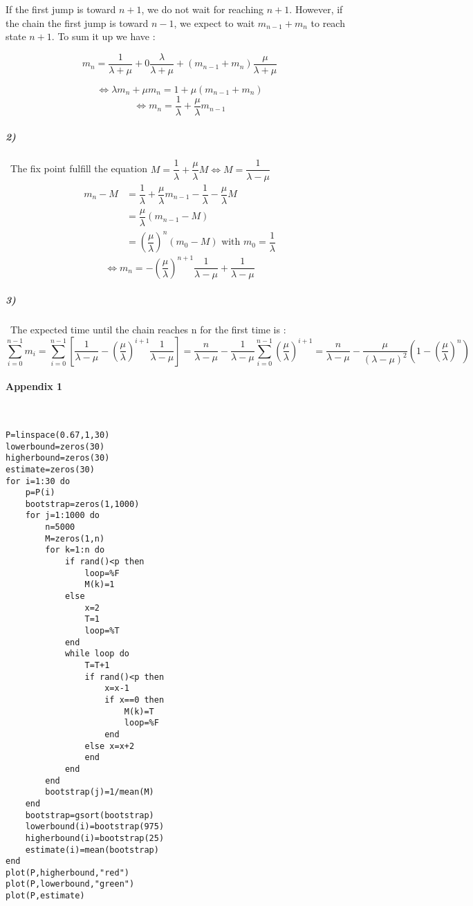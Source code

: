 \documentclass{article}
\begin{document}
If the first jump is toward $n+1$, we do not wait for reaching $n+1$. However, if the chain the first jump is toward $n-1$, we expect to wait $m_{n-1}+m_{n}$ to reach state $n+1$. To sum it up we have :

$$m_n=\dfrac{1}{\lambda+\mu}+0\dfrac{\lambda}{\lambda+\mu}+(m_{n-1}+m_{n})\dfrac{\mu}{\lambda+\mu}$$

$$\iff \lambda m_n+\mu m_n =1 + \mu (m_{n-1}+m_{n})$$
$$ \iff m_n=\dfrac{1}{\lambda}+\dfrac{\mu}{\lambda}m_{n-1}$$
\subparagraph{2)}
\
The fix point fulfill the equation $M=\dfrac{1}{\lambda}+\dfrac{\mu}{\lambda}M \iff M=\dfrac{1}{\lambda-\mu}$\\

\begin{align*}
m_n-M &= \dfrac{1}{\lambda}+\dfrac{\mu }{\lambda}m_{n-1}-\dfrac{1}{\lambda}-\dfrac{\mu}{\lambda}M\\
 &=\dfrac{\mu }{\lambda}(m_{n-1}-M) \\
 &=\left(\dfrac{\mu}{\lambda} \right)^n (m_{0}-M) \text{ with } m_0=\dfrac{1}{\lambda}
\end{align*}
$$\iff m_n=-\left(\dfrac{\mu}{\lambda} \right)^{n+1} \dfrac{1}{\lambda-\mu}+\dfrac{1}{\lambda-\mu}$$

\subparagraph{3)}
\
The expected time until the chain reaches n for the first time is : $$ \displaystyle \sum_{i=0}^{n-1}m_i=\sum_{i=0}^{n-1} \left[ \dfrac{1}{\lambda-\mu}-\left(\dfrac{\mu}{\lambda} \right)^{i+1} \dfrac{1}{\lambda-\mu} \right]=\dfrac{n}{\lambda-\mu}-\dfrac{1}{\lambda-\mu}\sum_{i=0}^{n-1} \left(\dfrac{\mu}{\lambda} \right)^{i+1}=\dfrac{n}{\lambda-\mu}-\dfrac{\mu}{(\lambda-\mu)^2} \left(1-\left(\dfrac{\mu}{\lambda} \right)^{n}\right) $$

\newpage
\appendix
\paragraph{Appendix 1}
\


\begin{lstlisting}
P=linspace(0.67,1,30)
lowerbound=zeros(30)
higherbound=zeros(30)
estimate=zeros(30)
for i=1:30 do 
    p=P(i)
    bootstrap=zeros(1,1000)
    for j=1:1000 do
        n=5000
        M=zeros(1,n)
        for k=1:n do
            if rand()<p then
                loop=%F
                M(k)=1
            else
                x=2
                T=1
                loop=%T
            end
            while loop do
                T=T+1
                if rand()<p then
                    x=x-1
                    if x==0 then
                        M(k)=T
                        loop=%F
                    end
                else x=x+2
                end
            end
        end
        bootstrap(j)=1/mean(M)
    end
    bootstrap=gsort(bootstrap)
    lowerbound(i)=bootstrap(975)
    higherbound(i)=bootstrap(25)
    estimate(i)=mean(bootstrap)
end
plot(P,higherbound,"red")
plot(P,lowerbound,"green")
plot(P,estimate)

\end{lstlisting}
\end{document}

